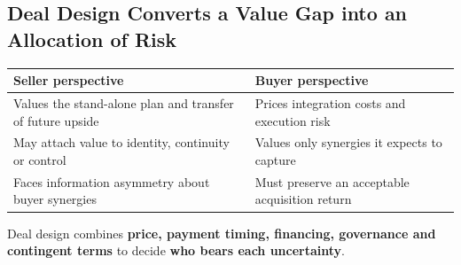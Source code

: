 \subsection{Deal Design Converts a Value Gap into an Allocation of Risk}
\begin{center}
\small
\begin{tabular}{@{}p{7cm}p{7cm}@{}}
\toprule
\textbf{Seller perspective} & \textbf{Buyer perspective}\\
\midrule
Values the stand-alone plan and transfer of future upside & Prices integration costs and execution risk\\
May attach value to identity, continuity or control & Values only synergies it expects to capture\\
Faces information asymmetry about buyer synergies & Must preserve an acceptable acquisition return\\
\bottomrule
\end{tabular}
\end{center}
\begin{keybox}
Deal design combines \textbf{price, payment timing, financing, governance and contingent terms} to decide \textbf{who bears each uncertainty}.
\end{keybox}

